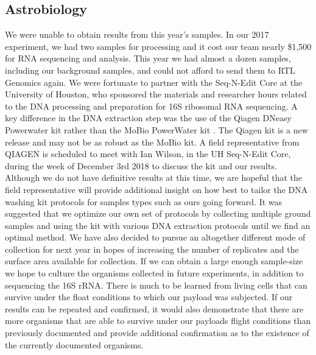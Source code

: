 \subsection{Astrobiology}
\label{sec:Astrobiology Results Discussion}
We were unable to obtain results from this year’s samples. In our 2017 experiment, we had two samples for processing and it cost our team nearly \$1,500 for RNA sequencing and analysis. This year we had almost a dozen samples, including our background samples, and could not afford to send them to RTL Genomics again. We were fortunate to partner with the Seq-N-Edit Core at the University of Houston, who sponsored the materials and researcher hours related to the DNA processing and preparation for 16S ribosomal RNA sequencing. A key difference in the DNA extraction step was the use of the Qiagen DNeasy Powerwater kit rather than the MoBio PowerWater kit \cite{SORA}. The Qiagen kit is a new release and may not be as robust as the MoBio kit. A field representative from QIAGEN is scheduled to meet with Ian Wilson, in the UH Seq-N-Edit Core, during the week of December 3rd 2018 to discuss the kit and our results. Although we do not have definitive results at this time, we are hopeful that the field representative will provide additional insight on how best to tailor the DNA washing kit protocols for samples types such as ours going forward. It was suggested that we optimize our own set of protocols by collecting multiple ground samples and using the kit with various DNA extraction protocols until we find an optimal method. We have also decided to pursue an altogether different mode of collection for next year in hopes of increasing the number of replicates and the surface area available for collection. If we can obtain a large enough sample-size we hope to culture the organisms collected in future experiments, in addition to sequencing the 16S rRNA. There is much to be learned from living cells that can survive under the float conditions to which our payload was subjected. If our results can be repeated and confirmed, it would also demonstrate that there are more organisms that are able to survive under our payloads flight conditions than previously documented and provide additional confirmation as to the existence of the currently documented organisms.
